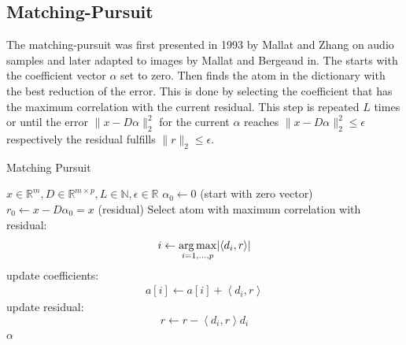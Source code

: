 \subsection{Matching-Pursuit}
\label{sec:mp}
The matching-pursuit was first presented in 1993 by Mallat and
Zhang\cite{Mallat1993} on audio samples and later adapted to images by Mallat
and Bergeaud in\cite{Mallat1995}.
The  starts with the coefficient vector $\alpha$ set to
zero. Then finds the atom in the dictionary with the best reduction of the
error. This is done by selecting the coefficient that has the maximum
correlation with the current residual. This step is repeated $L$ times
or until the error $\lVert x - D\alpha \rVert^{2}_{2}$ for the current $\alpha$
reaches $\lVert x - D\alpha \rVert^{2}_{2} \leq \epsilon$ respectively the
residual fulfills $\lVert r \rVert_2 \leq \epsilon$.
\begin{algorithm}[H]
\caption{Matching Pursuit}
\label{alg:mp}
\begin{algorithmic}[1]
\REQUIRE $x \in \mathbb{R}^m, D \in \mathbb{R}^{m\times p}, L \in \mathbb{N},
\epsilon \in \mathbb{R}$
\STATE $\alpha_0 \gets 0$ (start with zero vector)
\STATE $r_0 \gets x-D\alpha_0 = x$ (residual) 
\STATE Select atom with maximum correlation with residual: 
\begin{equation*}
i \gets \operatorname*{arg\,max}_{i=1,...,p} \lvert \left<d_i,r\right> \rvert
\end{equation*}
\STATE update coefficients: 
\begin{align}
a[i]  \gets a[i] + \left<d_i,r\right> \label{eq:mp_update}
\end{align}
\STATE update residual:
\begin{equation*}
 r \gets r - \left<d_i,r\right>d_i
\end{equation*}
\ENDWHILE
\RETURN $\alpha$
\end{algorithmic}
\end{algorithm}

